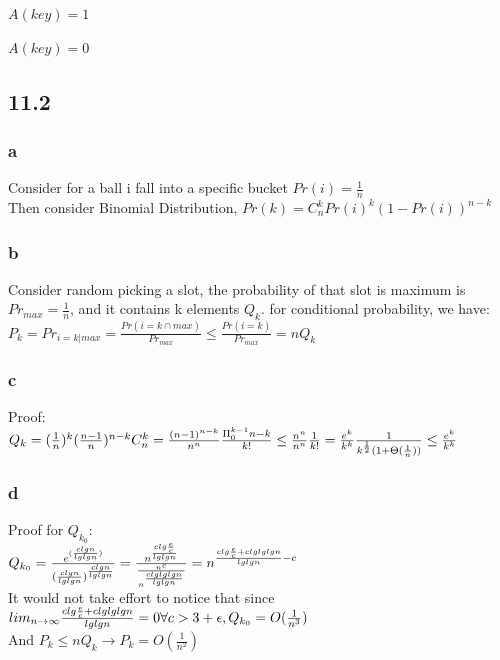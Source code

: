 \documentclass[]{article}
\begin{document}
\begin{codebox}
	\li $A(key) = 1$
\end{codebox}

\begin{codebox}
	\li $A(key) = 0$
\end{codebox}

\subsection{11.2}
\subsubsection{a}

Consider for a ball i fall into a specific bucket $Pr(i) = \frac{1}{n}$\\
Then consider Binomial Distribution, $Pr(k) = C_{n}^{k}Pr(i)^{k}(1-Pr(i))^{n-k}$

\subsubsection{b}

Consider random picking a slot, the probability of that slot is maximum is $Pr_{max} = \frac{1}{n}$, and it contains k elements $Q_{k}$. for conditional probability, we have:\\
$P_{k} = Pr_{i=k|max} = \frac{Pr(i=k \cap max)}{Pr_{max}} \le \frac{Pr(i=k)}{Pr_{max}} = nQ_{k}$

\subsubsection{c}

Proof:\\
$Q_k = (\frac{1}{n})^k(\frac{n-1}{n})^{n-k}C_{n}^{k} \\
= \frac{(n-1)^{n-k}}{n^n} \frac{\Pi_{0}^{k-1}n-k}{k!} \\
\le \frac{n^n}{n^n} \frac{1}{k!}\\
= \frac{e^k}{k^k} \frac{1}{k^{\frac{1}{2}} (1+\Theta(\frac{1}{n}))}\\
\le \frac{e^k}{k^k}$

\subsubsection{d}

Proof for $Q_{k_{0}}$: \\
$Q_{k_{0}} = \frac{e^{(\frac{clgn}{lglgn})}}{(\frac{clgn}{lglgn}) ^ {\frac{clgn}{lglgn}}}\\
= \frac{n^{\frac{clg\frac{e}{c}}{lglgn}}}{\frac{n^c}{n^{\frac{clglglgn}{lglgn}}}} = n^{\frac{clg\frac{e}{c} + clglglgn}{lglgn} - c}$\\
It would not take effort to notice that since ${lim}_{n\to \infty}\frac{clg\frac{e}{c} + clglglgn}{lglgn} =0\\
\forall c > 3+\epsilon, Q_{k_{0}} = O(\frac{1}{n^3}) $\\
And $P_{k} \le nQ_{k} \rightarrow P_{k} = O(\frac{1}{n^2})$
\end{document}
